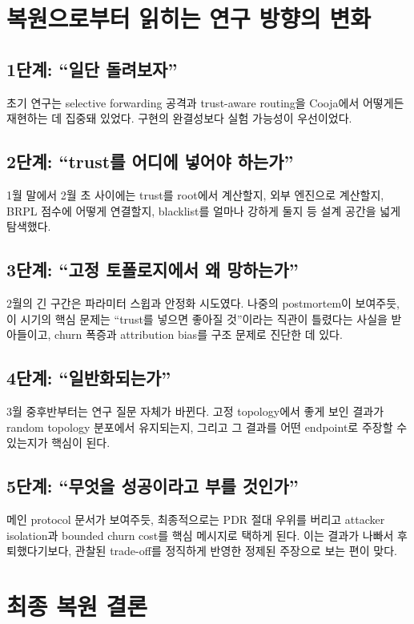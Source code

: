 \documentclass[12pt,a4paper]{article}
\begin{document}
\section{복원으로부터 읽히는 연구 방향의 변화}

\subsection{1단계: ``일단 돌려보자''}
초기 연구는 selective forwarding 공격과 trust-aware routing을
Cooja에서 어떻게든 재현하는 데 집중돼 있었다. 구현의 완결성보다
실험 가능성이 우선이었다.

\subsection{2단계: ``trust를 어디에 넣어야 하는가''}
1월 말에서 2월 초 사이에는 trust를 root에서 계산할지, 외부 엔진으로 계산할지,
BRPL 점수에 어떻게 연결할지, blacklist를 얼마나 강하게 둘지 등 설계 공간을
넓게 탐색했다.

\subsection{3단계: ``고정 토폴로지에서 왜 망하는가''}
2월의 긴 구간은 파라미터 스윕과 안정화 시도였다.
나중의 postmortem이 보여주듯, 이 시기의 핵심 문제는
``trust를 넣으면 좋아질 것''이라는 직관이 틀렸다는 사실을 받아들이고,
churn 폭증과 attribution bias를 구조 문제로 진단한 데 있다.

\subsection{4단계: ``일반화되는가''}
3월 중후반부터는 연구 질문 자체가 바뀐다.
고정 topology에서 좋게 보인 결과가 random topology 분포에서 유지되는지,
그리고 그 결과를 어떤 endpoint로 주장할 수 있는지가 핵심이 된다.

\subsection{5단계: ``무엇을 성공이라고 부를 것인가''}
메인 protocol 문서가 보여주듯, 최종적으로는
PDR 절대 우위를 버리고 attacker isolation과 bounded churn cost를
핵심 메시지로 택하게 된다. 이는 결과가 나빠서 후퇴했다기보다,
관찰된 trade-off를 정직하게 반영한 정제된 주장으로 보는 편이 맞다.

\section{최종 복원 결론}
\end{document}
